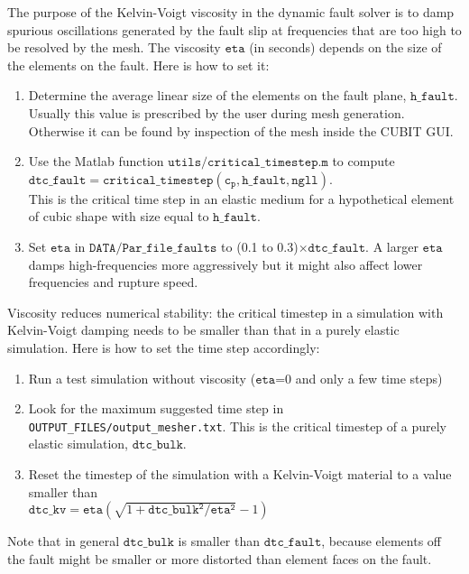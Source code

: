 The purpose of the Kelvin-Voigt viscosity in the dynamic fault solver
is to damp spurious oscillations generated by the fault slip at frequencies
that are too high to be resolved by the mesh. The viscosity $\mathtt{eta}$
(in seconds) depends on the size of the elements on the fault. Here
is how to set it:
\begin{enumerate}
\item Determine the average linear size of the elements on the fault plane,
$\mathtt{h\_fault}$. Usually this value is prescribed by the user
during mesh generation. Otherwise it can be found by inspection of
the mesh inside the CUBIT GUI.
\item Use the Matlab function $\mathtt{utils/critical\_timestep.m}$ to
compute\\
 $\mathtt{dtc\_fault}=\mathtt{critical\_timestep\left(c_{p},h\_fault,ngll\right)}$.
\\
This is the critical time step in an elastic medium for a hypothetical
element of cubic shape with size equal to $\mathtt{h\_fault}$.
\item Set $\mathtt{eta}$ in $\mathtt{DATA/Par\_file\_faults}$ to (0.1 to 0.3)$\ensuremath{\times}\mathtt{dtc\_fault}$.
A larger $\mathtt{eta}$ damps high-frequencies more aggressively
but it might also affect lower frequencies and rupture speed.
\end{enumerate}
Viscosity reduces numerical stability: the critical timestep in a
simulation with Kelvin-Voigt damping needs to be smaller than that
in a purely elastic simulation. Here is how to set the time step accordingly:
\begin{enumerate}
\item Run a test simulation without viscosity ($\mathtt{eta}$=0 and only
a few time steps)
\item Look for the \textquotedbl{}maximum suggested time step\textquotedbl{}
in \texttt{OUTPUT\_FILES/output\_mesher.txt}. This is the critical
timestep of a purely elastic simulation, $\mathtt{dtc\_bulk}$.
\item Reset the timestep of the simulation with a Kelvin-Voigt material
to a value smaller than\\
 $\mathtt{dtc\_kv}=\mathtt{eta}\left(\sqrt{1+\mathtt{dtc\_bulk^{2}}/\mathtt{eta^{2}}}-1\right)$
\end{enumerate}
Note that in general $\mathtt{dtc\_bulk}$ is smaller than $\mathtt{dtc\_fault}$,
because elements off the fault might be smaller or more distorted
than element faces on the fault.


